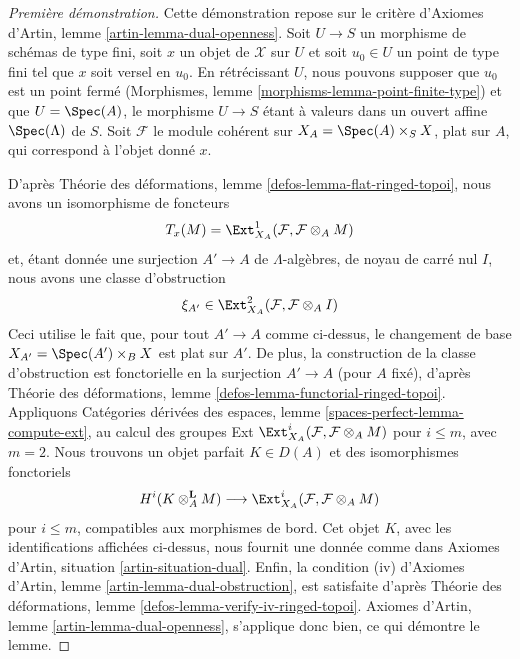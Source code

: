 \begin{proof}[Première démonstration]
Cette démonstration repose sur le critère d'Axiomes d'Artin, lemme
\ref{artin-lemma-dual-openness}. Soit $U \to S$ un morphisme de schémas de
type fini, soit $x$ un objet de $\mathcal{X}$ sur $U$ et soit $u_0 \in U$ un
point de type fini tel que $x$ soit versel en $u_0$. En rétrécissant $U$, nous
pouvons supposer que $u_0$ est un point fermé (Morphismes, lemme
\ref{morphisms-lemma-point-finite-type}) et que $U = \Spec(A)$, le morphisme
$U \to S$ étant à valeurs dans un ouvert affine $\Spec(\Lambda)$ de $S$.
Soit $\mathcal{F}$ le module cohérent sur
$X_A = \Spec(A) \times_S X$, plat sur $A$, qui correspond à l'objet donné
$x$.

\medskip\noindent
D'après Théorie des déformations, lemme
\ref{defos-lemma-flat-ringed-topoi}, nous avons un isomorphisme de foncteurs
$$
T_x(M) = \Ext^1_{X_A}(\mathcal{F}, \mathcal{F} \otimes_A M)
$$
et, étant donnée une surjection $A' \to A$ de $\Lambda$-algèbres, de noyau de
carré nul $I$, nous avons une classe d'obstruction
$$
\xi_{A'} \in \Ext^2_{X_A}(\mathcal{F}, \mathcal{F} \otimes_A I)
$$
Ceci utilise le fait que, pour tout $A' \to A$ comme ci-dessus, le changement
de base $X_{A'} = \Spec(A') \times_B X$ est plat sur $A'$. De plus, la
construction de la classe d'obstruction est fonctorielle en la surjection
$A' \to A$ (pour $A$ fixé), d'après Théorie des déformations, lemme
\ref{defos-lemma-functorial-ringed-topoi}. Appliquons Catégories dérivées des
espaces, lemme \ref{spaces-perfect-lemma-compute-ext}, au calcul des groupes
Ext $\Ext^i_{X_A}(\mathcal{F}, \mathcal{F} \otimes_A M)$ pour $i \leq m$,
avec $m = 2$. Nous trouvons un objet parfait $K \in D(A)$ et des
isomorphismes fonctoriels
$$
H^i(K \otimes_A^\mathbf{L} M)
\longrightarrow
\Ext^i_{X_A}(\mathcal{F}, \mathcal{F} \otimes_A M)
$$
pour $i \leq m$, compatibles aux morphismes de bord. Cet objet $K$, avec les
identifications affichées ci-dessus, nous fournit une donnée comme dans
Axiomes d'Artin, situation \ref{artin-situation-dual}. Enfin, la condition (iv)
d'Axiomes d'Artin, lemme \ref{artin-lemma-dual-obstruction}, est satisfaite
d'après Théorie des déformations, lemme
\ref{defos-lemma-verify-iv-ringed-topoi}. Axiomes d'Artin, lemme
\ref{artin-lemma-dual-openness}, s'applique donc bien, ce qui démontre le
lemme.
\end{proof}

